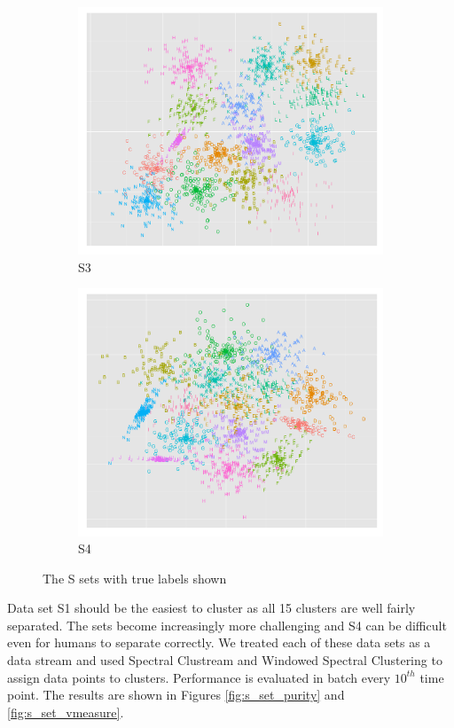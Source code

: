 \begin{figure}[H]
\begin{subfigure}{.4\textwidth}
  \centering
  \includegraphics[width=.9\linewidth]{s_set/s_set_3_truth.png}
  \caption{S3}
\end{subfigure}%
\begin{subfigure}{.4\textwidth}
  \centering
  \includegraphics[width=.9\linewidth]{s_set/s_set_4_truth.png}
  \caption{S4}
\end{subfigure}
\caption{The S sets with true labels shown}
\label{fig:s_set_truth}
\end{figure}

Data set S1 should be the easiest to cluster as all 15 clusters are well fairly separated. The sets become increasingly more challenging and S4 can be difficult even for humans to separate correctly.  We treated each of these data sets as a data stream and used Spectral Clustream and Windowed Spectral Clustering to assign data points to clusters. Performance is evaluated in batch every $10^{th}$ time point. The results are shown in Figures \ref{fig:s_set_purity} and \ref{fig:s_set_vmeasure}. 

